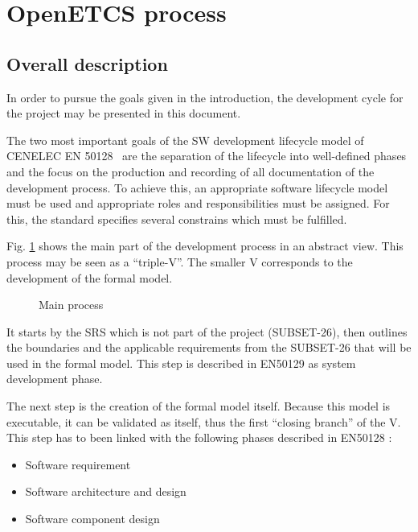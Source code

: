 
\section{OpenETCS process}


\subsection{Overall description}



In order to pursue the goals given in the introduction, the development cycle for the project may be presented in this document.

The two most important goals of the SW development lifecycle model of CENELEC EN
50128~\cite{EN-50128} are the separation of the lifecycle into well-defined
phases and the focus on the production and recording of all documentation of the
development process. To achieve this, an appropriate software lifecycle model
must be used and appropriate roles and responsibilities must be assigned. For
this, the standard specifies several constrains which must be fulfilled.

Fig. \ref{fig:main_process} shows the main part of the development process in an abstract view. This process may be seen
as a ``triple-V''. The smaller V corresponds to the development of the formal model. 
 
 \begin{figure}
  \centering
  \caption{Main process}
  \label{fig:main_process}
\end{figure}
 
 
It starts by the SRS which is not part of the project (SUBSET-26), then outlines the boundaries and 
the applicable requirements from the SUBSET-26 that will be used in the formal model. This step  is described in EN50129  as system development phase.

The next step is the creation of the formal model itself. Because this model is executable, it can 
be validated as itself, thus the first ``closing branch'' of the V.
This step has to been linked with the following phases described in EN50128 :
\begin{itemize}
\item Software requirement
\item Software architecture and design
\item Software component design
\end{itemize}

